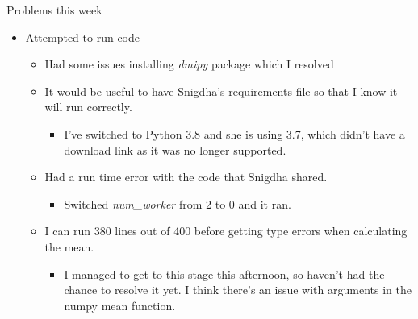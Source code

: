 \documentclass{beamer}
\begin{document}
\begin{frame}{Problems this week}
\begin{itemize}
    \item Attempted to run code
    \begin{itemize}
        \item Had some issues installing \emph{dmipy} package which I resolved
        \item It would be useful to have Snigdha's requirements file so that I know it will run correctly.
        \begin{itemize}
            \item I've switched to Python 3.8 and she is using 3.7, which didn't have a download link as it was no longer supported.
        \end{itemize}
        \item Had a run time error with the code that Snigdha shared.
            \begin{itemize}
                \item Switched \emph{num\_worker} from 2 to 0 and it ran. 
            \end{itemize}
        \item I can run 380 lines out of 400 before getting type errors when calculating the mean.
        \begin{itemize}
            \item I managed to get to this stage this afternoon, so haven't had the chance to resolve it yet. I think there's an issue with arguments in the numpy mean function.
        \end{itemize}
        \end{itemize}
    \end{itemize}
\end{frame}
\end{document}
